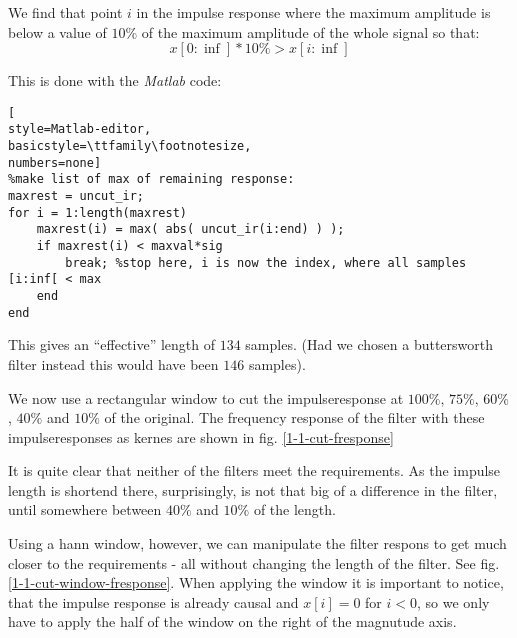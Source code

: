 We find that point $i$ in the impulse response where the maximum amplitude is
below a value of $10\%$ of the maximum amplitude of the whole signal so that:
\begin{equation*}
x[0:\inf] * 10\% > x[i:\inf]
\end{equation*}

This is done with the \emph{Matlab} code:
\begin{lstlisting}[
style=Matlab-editor,
basicstyle=\ttfamily\footnotesize,
numbers=none]
%make list of max of remaining response:
maxrest = uncut_ir;
for i = 1:length(maxrest)
    maxrest(i) = max( abs( uncut_ir(i:end) ) );
    if maxrest(i) < maxval*sig
        break; %stop here, i is now the index, where all samples [i:inf[ < max
    end
end
\end{lstlisting}

This gives an ``effective'' length of $134$ samples. (Had we chosen a
buttersworth filter instead this would have been $146$ samples).

We now use a rectangular window to cut the impulseresponse at $100\%$, $75\%$,
$60\%$, $40\%$ and $10\%$ of the original. The frequency response of the filter
with these impulseresponses as kernes are shown in fig. \ref{1-1-cut-fresponse}


It is quite clear that neither of the filters meet the requirements. As the
impulse length is shortend there, surprisingly, is not that big of a difference
in the filter, until somewhere between $40\%$ and $10\%$ of the length.


Using a hann window, however, we can manipulate the filter respons to get much
closer to the requirements - all without changing the length of the filter. See
fig. \ref{1-1-cut-window-fresponse}.
When applying the window it is important to notice, that the impulse
response is already causal and $x[i] = 0$ for $i<0$, so we only have to apply the half of
the window on the right of the magnutude axis.

